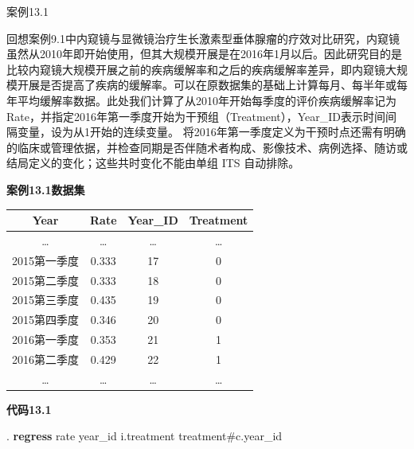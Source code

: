 \documentclass[
  chinese-hans,
  letterpaper,
  DIV=11,
  numbers=noendperiod]{scrreprt}
\newenvironment{Shaded}{\begin{snugshade}}{\end{snugshade}}
\newcommand{\KeywordTok}[1]{\textcolor[rgb]{0.00,0.23,0.31}{\textbf{#1}}}
\newcommand{\NormalTok}[1]{\textcolor[rgb]{0.00,0.23,0.31}{#1}}
\newcounter{none} %
\begin{document}
案例13.1

回想案例9.1中内窥镜与显微镜治疗生长激素型垂体腺瘤的疗效对比研究，内窥镜虽然从2010年即开始使用，但其大规模开展是在2016年1月以后。因此研究目的是比较内窥镜大规模开展之前的疾病缓解率和之后的疾病缓解率差异，即内窥镜大规模开展是否提高了疾病的缓解率。可以在原数据集的基础上计算每月、每半年或每年平均缓解率数据。此处我们计算了从2010年开始每季度的评价疾病缓解率记为Rate，并指定2016年第一季度开始为干预组（Treatment），Year\_ID表示时间间隔变量，设为从1开始的连续变量。
将2016年第一季度定义为干预时点还需有明确的临床或管理依据，并检查同期是否伴随术者构成、影像技术、病例选择、随访或结局定义的变化；这些共时变化不能由单组
ITS 自动排除。

\textbf{案例13.1数据集}

{\def\LTcaptype{none} %
\begin{longtable}[]{@{}cccc@{}}
\toprule\noalign{}
Year & Rate & Year\_ID & Treatment \\
\midrule\noalign{}
\endhead
\bottomrule\noalign{}
\endlastfoot
\ldots{} & \ldots{} & \ldots{} & \ldots{} \\
2015第一季度 & 0.333 & 17 & 0 \\
2015第二季度 & 0.333 & 18 & 0 \\
2015第三季度 & 0.435 & 19 & 0 \\
2015第四季度 & 0.346 & 20 & 0 \\
2016第一季度 & 0.353 & 21 & 1 \\
2016第二季度 & 0.429 & 22 & 1 \\
\ldots{} & \ldots{} & \ldots{} & \ldots{} \\
\end{longtable}
}

\begin{tcolorbox}[enhanced jigsaw, arc=.35mm, bottomrule=.15mm, breakable, colback=white, colframe=quarto-callout-note-color-frame, left=2mm, leftrule=.75mm, opacityback=0, rightrule=.15mm, toprule=.15mm]

\vspace{-3mm}\textbf{代码13.1}\vspace{3mm}

\begin{Shaded}
\begin{Highlighting}[]
\NormalTok{. }\KeywordTok{regress}\NormalTok{ rate year\_id i.treatment treatment\#c.year\_id}
\end{Highlighting}
\end{Shaded}

\end{tcolorbox}
\end{document}
